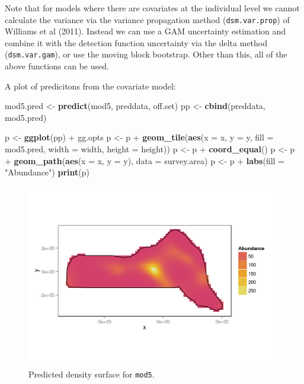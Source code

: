 \documentclass[]{amsart}
\makeatletter
\newenvironment{Shaded}{}{}
\newcommand{\KeywordTok}[1]{\textcolor[rgb]{0.00,0.44,0.13}{\textbf{{#1}}}}
\newcommand{\DataTypeTok}[1]{\textcolor[rgb]{0.56,0.13,0.00}{{#1}}}
\newcommand{\StringTok}[1]{\textcolor[rgb]{0.25,0.44,0.63}{{#1}}}
\newcommand{\NormalTok}[1]{{#1}}
\def\maxwidth{\ifdim\Gin@nat@width>\linewidth\linewidth
\else\Gin@nat@width\fi}
\let\Oldincludegraphics\includegraphics
\renewcommand{\includegraphics}[1]{\Oldincludegraphics[width=\maxwidth]{#1}}
\makeatother
\begin{document}
Note that for models where there are covariates at the individual level
we cannot calculate the variance via the variance propagation method
(\texttt{dsm.var.prop}) of Williams et al (2011). Instead we can use a
GAM uncertainty estimation and combine it with the detection function
uncertainty via the delta method (\texttt{dsm.var.gam}), or use the
moving block bootstrap. Other than this, all of the above functions can
be used.

A plot of predicitons from the covariate model:

\begin{Shaded}
\begin{Highlighting}[]
\NormalTok{mod5.pred <-}\StringTok{ }\KeywordTok{predict}\NormalTok{(mod5, preddata, off.set)}
\NormalTok{pp <-}\StringTok{ }\KeywordTok{cbind}\NormalTok{(preddata, mod5.pred)}

\NormalTok{p <-}\StringTok{ }\KeywordTok{ggplot}\NormalTok{(pp) +}\StringTok{ }\NormalTok{gg.opts}
\NormalTok{p <-}\StringTok{ }\NormalTok{p +}\StringTok{ }\KeywordTok{geom_tile}\NormalTok{(}\KeywordTok{aes}\NormalTok{(}\DataTypeTok{x =} \NormalTok{x, }\DataTypeTok{y =} \NormalTok{y, }\DataTypeTok{fill =} \NormalTok{mod5.pred, }\DataTypeTok{width =} \NormalTok{width, }\DataTypeTok{height =} \NormalTok{height))}
\NormalTok{p <-}\StringTok{ }\NormalTok{p +}\StringTok{ }\KeywordTok{coord_equal}\NormalTok{()}
\NormalTok{p <-}\StringTok{ }\NormalTok{p +}\StringTok{ }\KeywordTok{geom_path}\NormalTok{(}\KeywordTok{aes}\NormalTok{(}\DataTypeTok{x =} \NormalTok{x, }\DataTypeTok{y =} \NormalTok{y), }\DataTypeTok{data =} \NormalTok{survey.area)}
\NormalTok{p <-}\StringTok{ }\NormalTok{p +}\StringTok{ }\KeywordTok{labs}\NormalTok{(}\DataTypeTok{fill =} \StringTok{"Abundance"}\NormalTok{)}
\KeywordTok{print}\NormalTok{(p)}
\end{Highlighting}
\end{Shaded}

\begin{figure}[htbp]
\centering
\includegraphics{mexico-figs/mod5-pred.png}
\caption{Predicted density surface for \texttt{mod5}.}
\end{figure}
\end{document}
